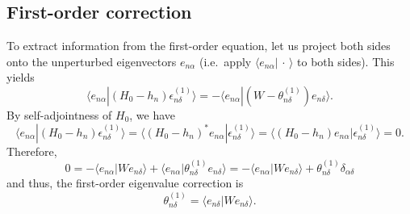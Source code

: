 \subsection{First-order correction}
To extract information from the first-order equation, let us project both sides onto the unperturbed eigenvectors $e_{n\alpha}$ (i.e.\ apply $\langle e_{n\alpha}|\,\cdot\,\rangle$ to both sides). This yields
\begin{equation*}
\langle e_{n\alpha}|(H_0-h_n)\epsilon_{n\delta}^{(1)} \rangle = -\langle e_{n\alpha}|(W -\theta_{n\delta}^{(1)}) e_{n\delta}\rangle.
\end{equation*}
By self-adjointness of $H_0$, we have
\begin{equation*}
\langle e_{n\alpha}|(H_0-h_n)\epsilon_{n\delta}^{(1)} \rangle =\langle (H_0-h_n)^*e_{n\alpha}|\epsilon_{n\delta}^{(1)} \rangle =  \langle (H_0-h_n)e_{n\alpha}|\epsilon_{n\delta}^{(1)} \rangle = 0.
\end{equation*}
Therefore,
\begin{equation*}
0 = -\langle e_{n\alpha}|W e_{n\delta}\rangle + \langle e_{n\alpha}|\theta_{n\delta}^{(1)} e_{n\delta}\rangle = -\langle e_{n\alpha}|W e_{n\delta}\rangle + \theta_{n\delta}^{(1)} \delta_{\alpha\delta} 
\end{equation*}
and thus, the first-order eigenvalue correction is 
\begin{equation*}
\theta_{n\delta}^{(1)} = \langle e_{n\delta}|W e_{n\delta}\rangle .
\end{equation*}

